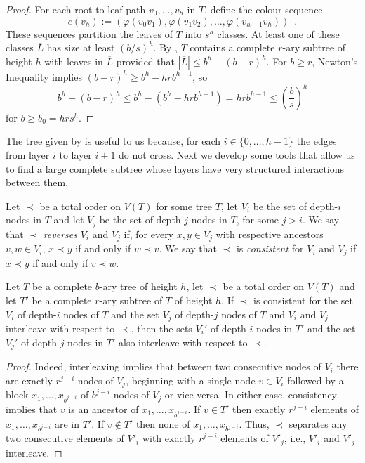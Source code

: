 \documentclass[kpfonts]{patmorin}
\begin{document}
\begin{proof}
  For each root to leaf path $v_0,\ldots,v_h$ in $T$, define the colour sequence
  \[  c(v_h):=(\varphi(v_0v_1),\varphi(v_1v_2),\ldots,\varphi(v_{h-1}v_h)) \enspace .
  \]  
  These sequences partition the leaves of $T$ into $s^h$ classes.  At least one of these classes $\overline{L}$ has size at least $(b/s)^h$.  
  By , $T$ contains a complete $r$-ary subtree of height $h$ with leaves in $\overline{L}$ provided that $|\overline{L}|\le b^h-(b-r)^h$.  For $b\ge r$, Newton's Inequality implies $(b-r)^h\ge b^h-hrb^{h-1}$, so
  \[  b^h-(b-r)^h \le b^h-(b^h - hrb^{h-1}) = hrb^{h-1} \le \left(\frac{b}{s}\right)^h \]
  for $b \ge b_0=hrs^h$.
\end{proof}

The tree given by  is useful to us because, for each $i\in\{0,\ldots,h-1\}$ the edges from layer $i$ to layer $i+1$ do not cross. Next we develop some tools that allow us to find a large complete subtree whose layers have very structured interactions between them.

Let $\prec$ be a total order on $V(T)$ for some tree $T$, let $V_i$ be the set of depth-$i$ nodes in $T$ and let $V_j$ be the set of depth-$j$ nodes in $T$, for some $j>i$.  We say that $\prec$ \emph{reverses} $V_i$ and $V_j$ if, for every $x,y\in V_j$ with respective ancestors $v,w\in V_i$, $x\prec y$ if and only if $w\prec v$.  We say that $\prec$ is \emph{consistent} for $V_i$ and $V_j$ if $x\prec y$ if and only if $v\prec w$.  

\begin{lem}
  Let $T$ be a complete $b$-ary tree of height $h$, let $\prec$ be a total order on $V(T)$ and let $T'$ be a complete $r$-ary subtree of $T$ of height $h$.  If $\prec$ is consistent for the set $V_i$ of depth-$i$ nodes of $T$ and the set $V_j$ of depth-$j$ nodes of $T$ and $V_i$ and $V_j$ interleave with respect to $\prec$, then the sets $V_i'$ of depth-$i$ nodes in $T'$ and the set $V_j'$ of depth-$j$ nodes in $T'$ also interleave with respect to $\prec$.
\end{lem}

\begin{proof}
  Indeed, interleaving implies that between two consecutive nodes of $V_i$ there are exactly $r^{j-i}$ nodes of $V_j$, beginning with a single node $v\in V_i$ followed by a block $x_1,\ldots,x_{b^{j-i}}$ of $b^{j-i}$ nodes of $V_j$ or vice-versa.  In either case, consistency implies that $v$ is an ancestor of $x_1,\ldots,x_{b^{j-i}}$.  If $v\in T'$ then exactly $r^{j-i}$ elements of $x_1,\ldots,x_{b^{j-i}}$ are in $T'$.  If $v\not\in T'$ then none of  $x_1,\ldots,x_{b^{j-i}}$.  Thus, $\prec$ separates any two consecutive elements of $V'_i$ with exactly $r^{j-i}$ elements of $V'_j$, i.e., $V'_i$ and $V'_j$ interleave.
\end{proof}
\end{document}

